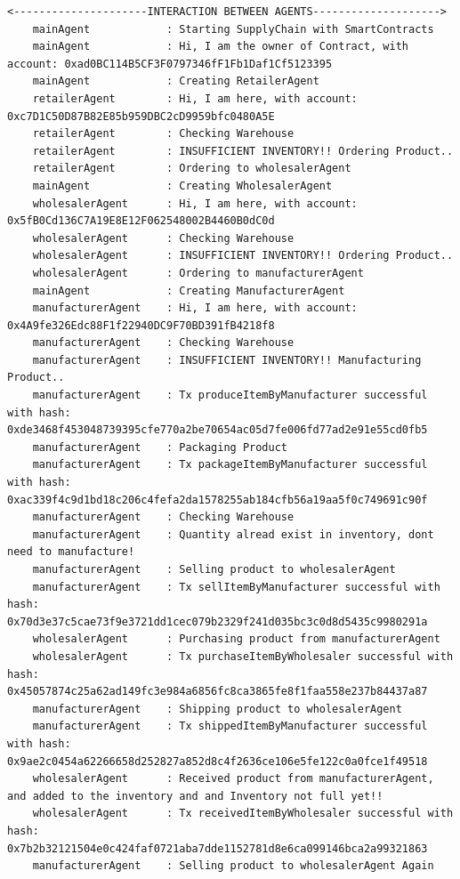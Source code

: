 \begin{itemize}
\begin{lstlisting}[caption={Agent Interaction (Scenario 4},label={Scenario4}, numbers=none, basicstyle=\ttfamily\tiny]
    <---------------------INTERACTION BETWEEN AGENTS-------------------->
    mainAgent            : Starting SupplyChain with SmartContracts
    mainAgent            : Hi, I am the owner of Contract, with account: 0xad0BC114B5CF3F0797346fF1Fb1Daf1Cf5123395
    mainAgent            : Creating RetailerAgent
    retailerAgent        : Hi, I am here, with account: 0xc7D1C50D87B82E85b959DBC2cD9959bfc0480A5E
    retailerAgent        : Checking Warehouse
    retailerAgent        : INSUFFICIENT INVENTORY!! Ordering Product..
    retailerAgent        : Ordering to wholesalerAgent
    mainAgent            : Creating WholesalerAgent
    wholesalerAgent      : Hi, I am here, with account: 0x5fB0Cd136C7A19E8E12F062548002B4460B0dC0d
    wholesalerAgent      : Checking Warehouse
    wholesalerAgent      : INSUFFICIENT INVENTORY!! Ordering Product..
    wholesalerAgent      : Ordering to manufacturerAgent
    mainAgent            : Creating ManufacturerAgent
    manufacturerAgent    : Hi, I am here, with account: 0x4A9fe326Edc88F1f22940DC9F70BD391fB4218f8
    manufacturerAgent    : Checking Warehouse
    manufacturerAgent    : INSUFFICIENT INVENTORY!! Manufacturing Product..
    manufacturerAgent    : Tx produceItemByManufacturer successful with hash: 0xde3468f453048739395cfe770a2be70654ac05d7fe006fd77ad2e91e55cd0fb5
    manufacturerAgent    : Packaging Product
    manufacturerAgent    : Tx packageItemByManufacturer successful with hash: 0xac339f4c9d1bd18c206c4fefa2da1578255ab184cfb56a19aa5f0c749691c90f
    manufacturerAgent    : Checking Warehouse
    manufacturerAgent    : Quantity alread exist in inventory, dont need to manufacture!
    manufacturerAgent    : Selling product to wholesalerAgent
    manufacturerAgent    : Tx sellItemByManufacturer successful with hash: 0x70d3e37c5cae73f9e3721dd1cec079b2329f241d035bc3c0d8d5435c9980291a
    wholesalerAgent      : Purchasing product from manufacturerAgent
    wholesalerAgent      : Tx purchaseItemByWholesaler successful with hash: 0x45057874c25a62ad149fc3e984a6856fc8ca3865fe8f1faa558e237b84437a87
    manufacturerAgent    : Shipping product to wholesalerAgent
    manufacturerAgent    : Tx shippedItemByManufacturer successful with hash: 0x9ae2c0454a62266658d252827a852d8c4f2636ce106e5fe122c0a0fce1f49518
    wholesalerAgent      : Received product from manufacturerAgent, and added to the inventory and and Inventory not full yet!!
    wholesalerAgent      : Tx receivedItemByWholesaler successful with hash: 0x7b2b32121504e0c424faf0721aba7dde1152781d8e6ca099146bca2a99321863
    manufacturerAgent    : Selling product to wholesalerAgent Again

\end{lstlisting}
\end{itemize}
